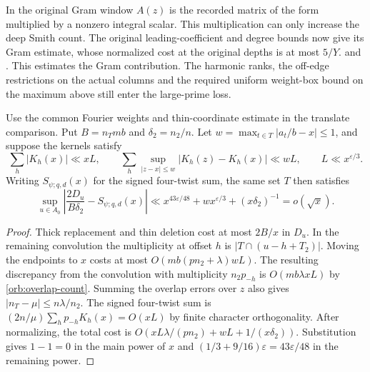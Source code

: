 In the original Gram window \(A(z)\) is the recorded matrix of
the form multiplied by a nonzero integral scalar. This multiplication
can only increase the deep Smith count. The original leading-coefficient
and degree bounds now give its Gram estimate, whose normalized cost
at the original depths is at most \(5/Y\).
and .
This estimates the Gram contribution. The harmonic ranks, the
off-edge restrictions on the actual columns and the required
uniform weight-box bound on the maximum above still enter the
large-prime loss.

\begin{corollary}
Use the common Fourier weights\label{orb:overlap} and thin-coordinate estimate in the
translate comparison. Put \(B=n_Tmb\) and \(\delta_2=n_2/n\).
Let \(w=\max_{t\in T}|a_t/b-x|\le1\), and suppose the kernels satisfy
\[
   \sum_h|K_h(x)|\ll xL,\qquad
   \sum_h\sup_{|z-x|\le w}|K_h(z)-K_h(x)|\ll wL,
   \qquad L\ll x^{\varepsilon/3}.
\]
Writing \(S_{\psi;q,d}(x)\) for the signed four-twist sum, the same
set \(T\) then satisfies
\[
  \sup_{u\in A_0}\left|\frac{2D_u}{B\delta_2}-S_{\psi;q,d}(x)\right|
   \ll x^{43\varepsilon/48}+w x^{\varepsilon/3}
                   + (x\delta_2)^{-1}
   =o(\sqrt x).
\]
\end{corollary}
\begin{proof}
Thick replacement and thin deletion cost at most \(2B/x\) in \(D_u\).
In the remaining convolution the multiplicity at offset \(h\) is
\(|T\cap(u-h+T_2)|\). Moving the endpoints to \(x\) costs at most
\(O(mb(pn_2+\lambda)wL)\). The resulting discrepancy from the
convolution with multiplicity \(n_2p_{-h}\) is \(O(mb\lambda xL)\)
by \eqref{orb:overlap-count}. Summing the overlap errors over \(z\)
also gives \(|n_T-\mu|\le n\lambda/n_2\). The signed four-twist sum
is \((2n/\mu)\sum_hp_{-h}K_h(x)=O(xL)\) by finite character
orthogonality. After normalizing, the total cost is
\(O(xL\lambda/(pn_2)+wL+1/(x\delta_2))\). Substitution gives
\(1-1=0\) in the main power of \(x\) and
\((1/3+9/16)\varepsilon=43\varepsilon/48\) in the remaining power.
\end{proof}

